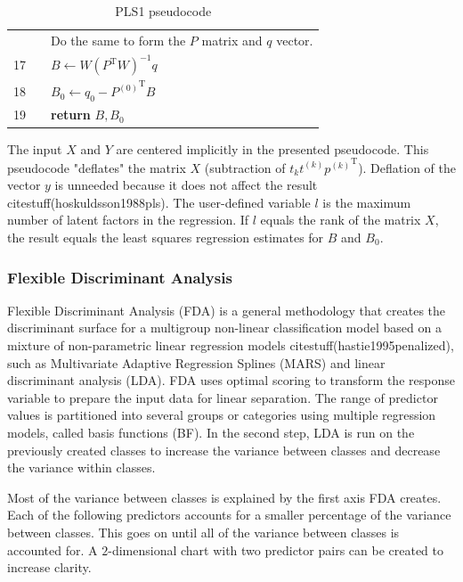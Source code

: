 \documentclass[preprint,12pt]{elsarticle}
\begin{document}
\begin{table}[ht]
{\begin{tabular}{|r l l l l|}
            \rowcolor{backcolour} & & \multicolumn{3}{l|}{Do the same to form the $P$ matrix and $q$ vector.} \\
            \rowcolor{backcolour} 17 & & \multicolumn{3}{l|}{$B\gets W{(P^{\mathrm{T}}W)}^{-1}q$} \\
            \rowcolor{backcolour} 18 & & \multicolumn{3}{l|}{$B_{0}\gets q_{0}-{P^{(0)}}^{\mathrm{T}}B$} \\
            \rowcolor{backcolour} 19 & & \multicolumn{3}{l|}{\textbf{return} $B, B_{0}$} \\
            \hline
        \end{tabular}
    }
    \caption{PLS1 pseudocode}
    \label{tab:PLS1}
\end{table}

The input $X$ and $Y$ are centered implicitly in the presented pseudocode. This pseudocode "deflates" the matrix $X$ (subtraction of $t_{k}t^{(k)}{p^{(k)}}^{\mathrm{T}}$). Deflation of the vector $y$ is unneeded because it does not affect the result citestuff(hoskuldsson1988pls). The user-defined variable $l$ is the maximum number of latent factors in the regression. If $l$ equals the rank of the matrix $X$, the result equals the least squares regression estimates for $B$ and $B_{0}$.

\subsubsection{Flexible Discriminant Analysis}

Flexible Discriminant Analysis (FDA) is a general methodology that creates the discriminant surface for a multigroup non-linear classification model based on a mixture of non-parametric linear regression models citestuff(hastie1995penalized), such as Multivariate Adaptive Regression Splines (MARS) and linear discriminant analysis (LDA). FDA uses optimal scoring to transform the response variable to prepare the input data for linear separation. The range of predictor values is partitioned into several groups or categories using multiple regression models, called basis functions (BF). In the second step, LDA is run on the previously created classes to increase the variance between classes and decrease the variance within classes.

Most of the variance between classes is explained by the first axis FDA creates. Each of the following predictors accounts for a smaller percentage of the variance between classes. This goes on until all of the variance between classes is accounted for. A $2$-dimensional chart with two predictor pairs can be created to increase clarity.
\end{document}
